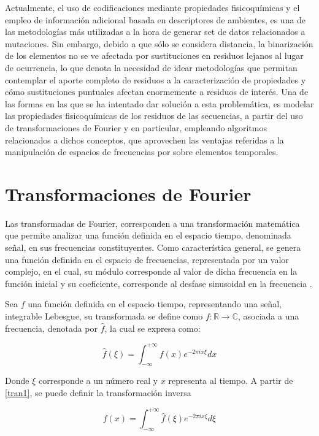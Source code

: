Actualmente, el uso de codificaciones mediante propiedades fisicoquímicas y el empleo de información adicional basada en descriptores de ambientes, es una de las metodologías más utilizadas a la hora de generar set de datos relacionados a mutaciones. Sin embargo, debido a que sólo se considera distancia, la binarización de los elementos no se ve afectada por sustituciones en residuos lejanos al lugar de ocurrencia, lo que denota la necesidad de idear metodologías que permitan contemplar el aporte completo de residuos a la caracterización de propiedades y cómo sustituciones puntuales afectan enormemente a residuos de interés. Una de las formas en las que se ha intentado dar solución a esta problemática, es modelar las propiedades fisicoquímicas de los residuos de las secuencias, a partir del uso de transformaciones de Fourier y en particular, empleando algoritmos relacionados a dichos conceptos, que aprovechen las ventajas referidas a la manipulación de espacios de frecuencias por sobre elementos temporales.

\section{Transformaciones de Fourier}

Las transformadas de Fourier, corresponden a una transformación matemática que permite analizar una función definida en el espacio tiempo, denominada señal, en sus frecuencias constituyentes. Como característica general, se genera una función definida en el espacio de frecuencias, representada por un valor complejo, en el cual, su módulo corresponde al valor de dicha frecuencia en la función inicial y su coeficiente, corresponde al desfase sinusoidal en la frecuencia \cite{sneddon1995fourier}.

Sea $f$ una función definida en el espacio tiempo, representando una señal, integrable Lebesgue, su transformada se define como $f: \mathbb{R} \to \mathbb{C}$, asociada a una frecuencia, denotada por $\hat{f}$, la cual se expresa como:

\begin{equation}
	\hat{f}(\xi) = \int_{-\infty}^{+\infty} f(x)e^{-2\pi i x \xi} dx
	\label{tran1}
\end{equation}

Donde $\xi$ corresponde a un número real y $x$ representa al tiempo. A partir de \ref{tran1}, se puede definir la transformación inversa

\begin{equation}
	f(x) = \int_{-\infty}^{+\infty} \hat{f}(\xi) e^{-2\pi i x \xi} d\xi
	\label{tran2}
\end{equation}

